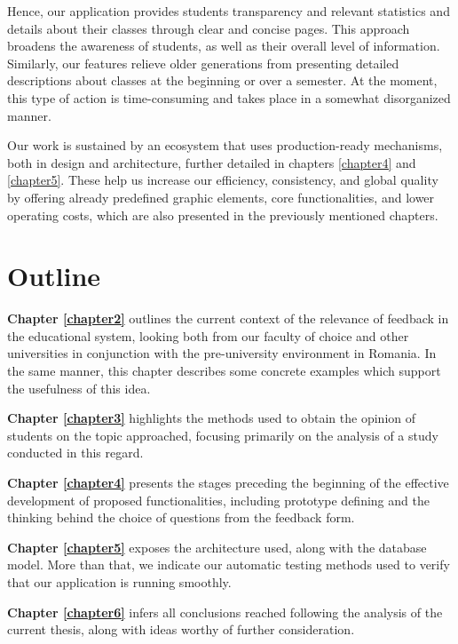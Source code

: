     Hence, our application provides students transparency and relevant statistics and details about their classes through clear and concise pages. This approach broadens the awareness of students, as well as their overall level of information. Similarly, our features relieve older generations from presenting detailed descriptions about classes at the beginning or over a semester. At the moment, this type of action is time-consuming and takes place in a somewhat disorganized manner.

    Our work is sustained by an ecosystem that uses production-ready mechanisms, both in design and architecture, further detailed in chapters \ref{chapter4} and \ref{chapter5}. These help us increase our efficiency, consistency, and global quality by offering already predefined graphic elements, core functionalities, and lower operating costs, which are also presented in the previously mentioned chapters.

\section{Outline} \label{1:outline}

    \textbf{Chapter \ref{chapter2}} outlines the current context of the relevance of feedback in the educational system, looking both from our faculty of choice and other universities in conjunction with the pre-university environment in Romania. In the same manner, this chapter describes some concrete examples which support the usefulness of this idea.
    
    \textbf{Chapter \ref{chapter3}} highlights the methods used to obtain the opinion of students on the topic approached, focusing primarily on the analysis of a study conducted in this regard.
    
    \textbf{Chapter \ref{chapter4}} presents the stages preceding the beginning of the effective development of proposed functionalities, including prototype defining and the thinking behind the choice of questions from the feedback form.
    
    \textbf{Chapter \ref{chapter5}} exposes the architecture used, along with the database model. More than that, we indicate our automatic testing methods used to verify that our application is running smoothly. 
    
    \textbf{Chapter \ref{chapter6}} infers all conclusions reached following the analysis of the current thesis, along with ideas worthy of further consideration.